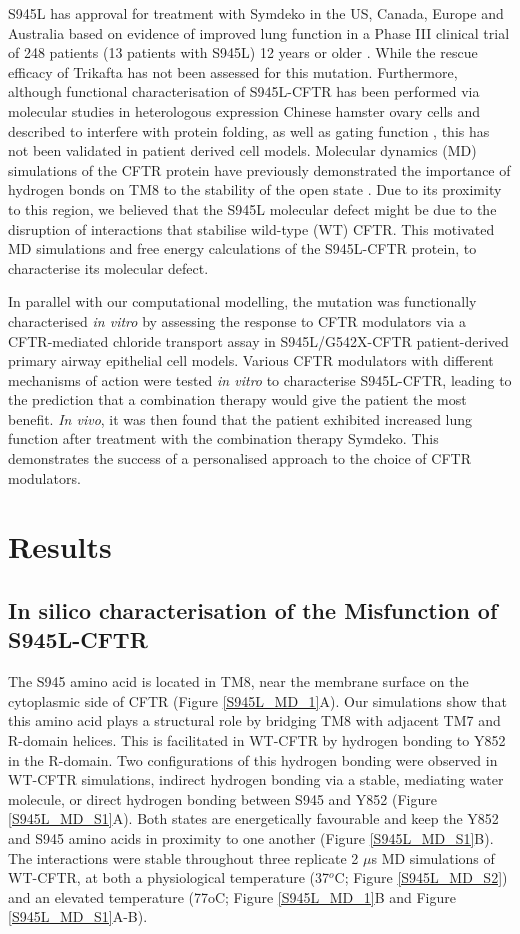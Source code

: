 S945L has approval for treatment with Symdeko in the US, Canada, Europe and Australia based on evidence of improved lung function in a Phase III clinical trial of 248 patients (13 patients with S945L) 12 years or older \cite{rowe2017}. While the rescue efficacy of Trikafta has not been assessed for this mutation. Furthermore, although functional characterisation of S945L-CFTR has been performed via molecular studies in heterologous expression Chinese hamster ovary cells and described to interfere with protein folding, as well as gating function \cite{seibert1996}, this has not been validated in patient derived cell models. Molecular dynamics (MD) simulations of the CFTR protein have previously demonstrated the importance of hydrogen bonds on TM8 to the stability of the open state \cite{corradi2018}. Due to its proximity to this region, we believed that the S945L molecular defect might be due to the disruption of interactions that stabilise wild-type (WT) CFTR. This motivated MD simulations and free energy calculations of the S945L-CFTR protein, to characterise its molecular defect.

In parallel with our computational modelling, the mutation was functionally characterised \textit{in vitro} by assessing the response to CFTR modulators via a CFTR-mediated chloride transport assay in S945L/G542X-CFTR patient-derived primary airway epithelial cell models. Various CFTR modulators with different mechanisms of action were tested \textit{in vitro} to characterise S945L-CFTR, leading to the prediction that a combination therapy would give the patient the most benefit. \textit{In vivo}, it was then found that the patient exhibited increased lung function after treatment with the combination therapy Symdeko. This demonstrates the success of a personalised approach to the choice of CFTR modulators. 

\section{Results}

\subsection{In silico characterisation of the Misfunction of S945L-CFTR}
The S945 amino acid is located in TM8, near the membrane surface on the cytoplasmic side of CFTR (Figure \ref{S945L_MD_1}A). Our simulations show that this amino acid plays a structural role by bridging TM8 with adjacent TM7 and R-domain helices. This is facilitated in WT-CFTR by hydrogen bonding to Y852 in the R-domain. Two configurations of this hydrogen bonding were observed in WT-CFTR simulations, indirect hydrogen bonding via a stable, mediating water molecule, or direct hydrogen bonding between S945 and Y852 (Figure \ref{S945L_MD_S1}A). Both states are energetically favourable and keep the Y852 and S945 amino acids in proximity to one another (Figure \ref{S945L_MD_S1}B). The interactions were stable throughout three replicate 2 $\mu$s MD simulations of WT-CFTR, at both a physiological temperature (37$^o$C; Figure \ref{S945L_MD_S2}) and an elevated temperature (77oC; Figure \ref{S945L_MD_1}B and Figure \ref{S945L_MD_S1}A-B). 

